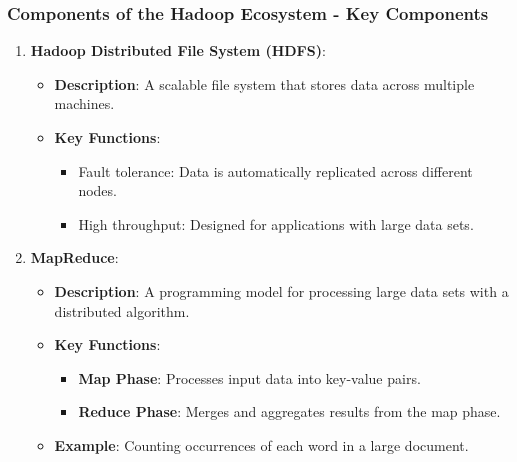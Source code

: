 \documentclass[aspectratio=169]{beamer}
\begin{document}
\begin{frame}[fragile]
    \frametitle{Components of the Hadoop Ecosystem - Key Components}
    \begin{enumerate}
        \item \textbf{Hadoop Distributed File System (HDFS)}:
            \begin{itemize}
                \item \textbf{Description}: A scalable file system that stores data across multiple machines.
                \item \textbf{Key Functions}:
                    \begin{itemize}
                        \item Fault tolerance: Data is automatically replicated across different nodes.
                        \item High throughput: Designed for applications with large data sets.
                    \end{itemize}
            \end{itemize}
        
        \item \textbf{MapReduce}:
            \begin{itemize}
                \item \textbf{Description}: A programming model for processing large data sets with a distributed algorithm.
                \item \textbf{Key Functions}:
                    \begin{itemize}
                        \item \textbf{Map Phase}: Processes input data into key-value pairs.
                        \item \textbf{Reduce Phase}: Merges and aggregates results from the map phase.
                    \end{itemize}
                \item \textbf{Example}: Counting occurrences of each word in a large document.
            \end{itemize}
    \end{enumerate}
\end{frame}
\end{document}
